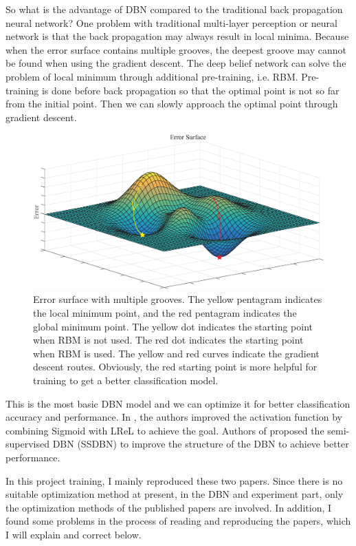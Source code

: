 \documentclass{bioinfo}
\begin{document}
So what is the advantage of DBN compared to the traditional back propagation neural network? One problem with traditional multi-layer perception or neural network is that the back propagation may always result in local minima. Because when the error surface contains multiple grooves, the deepest groove may cannot be found when using the gradient descent. The deep belief network can solve the problem of local minimum through additional pre-training, i.e. RBM. Pre-training is done before back propagation so that the optimal point is not so far from the initial point. Then we can slowly approach the optimal point through gradient descent.

\begin{figure}[htbp]
	\centering
	\includegraphics[width=\columnwidth]{surface.eps}
	\caption{Error surface with multiple grooves. The yellow pentagram indicates the local minimum point, and the red pentagram indicates the global minimum point. The yellow dot indicates the starting point when RBM is not used. The red dot indicates the starting point when RBM is used. The yellow and red curves indicate the gradient descent routes. Obviously, the red starting point is more helpful for training to get a better classification model.}
	\label{fig:surface}
\end{figure}

This is the most basic DBN model and we can optimize it for better classification accuracy and performance. In \cite{YiThe}, the authors improved the activation function by combining Sigmoid with LReL to achieve the goal. Authors of \cite{wang2017improved} proposed the semi-supervised DBN (SSDBN) to improve the structure of the DBN to achieve better performance.

In this project training, I mainly reproduced these two papers. Since there is no suitable optimization method at present, in the DBN and experiment part, only the optimization methods of the published papers are involved. In addition, I found some problems in the process of reading and reproducing the papers, which I will explain and correct below.
\end{document}
